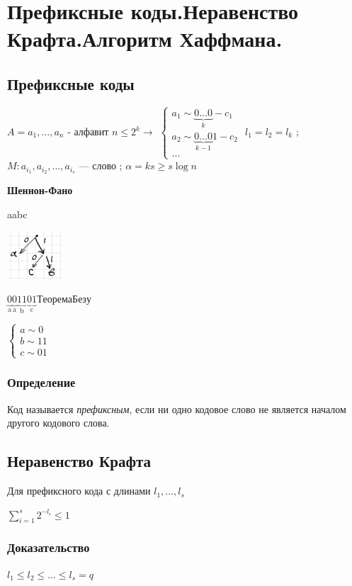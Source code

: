\documentclass[12pt]{article}
\begin{document}
\section{Префиксные коды.Неравенство Крафта.Алгоритм Хаффмана.}
\subsection{Префиксные коды}
$A = {a_1, \dots, a_n}$ - алфавит $ n \leq2^k\rightarrow$
$\begin{cases}
        a_1  \sim \underbrace{0\dots0}_{k} - c_1      \\
        a_2  \sim \underbrace{0\dots0}_{k - 1}1 - c_2 \\
        \dots
    \end{cases}$
\newline$l_1=l_2=l_k$ ; $M:a_{i_1},a_{i_2},\dots,a_{i_s}$ — слово ; $\alpha=ks\geq s\log{n}$

\textbf{Шеннон-Фано}

aabc

\includegraphics[width=20mm]{images/tree1.png}

$\underbrace{0}_{\text{a}}\underbrace{0}_{\text{a}}\underbrace{11}_{\text{b}}\underbrace{01}_{\text{c}}Теорема Безу$

$\begin{cases}
        a  \sim 0  \\
        b  \sim 11 \\
        c \sim 01
    \end{cases}$

\subsubsection{Определение}
Код называется \textit{префиксным}, если ни одно кодовое слово не является началом другого кодового слова.

\subsection{Неравенство Крафта}
Для префиксного кода с длинами $l_1,\dots,l_s$

$\sum\limits_{i=1}^s 2^{-l_i} \leq 1$
\subsubsection{Доказательство}
$l_1\leq l_2 \leq \dots \leq l_s=q$
\end{document}
